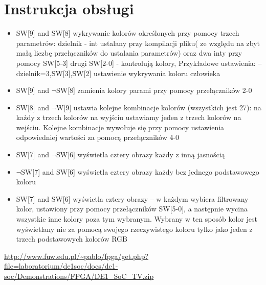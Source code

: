\documentclass{article}
\begin{document}
\section*{Instrukcja obsługi}
\begin{itemize}
    

\item SW[9] and SW[8]
 wykrywanie kolorów określonych przy pomocy trzech parametrów: dzielnik - int ustalany przy kompilacji pliku( ze względu
na zbyt małą liczbę przełączników do ustalania parametrów) oraz dwa inty przy pomocy SW[5-3] drugi SW[2-0] - kontrolują kolory,
Przykładowe ustawienia: 
--dzielnik=3,SW[3],SW[2] ustawienie wykrywania koloru człowieka


\item SW[9] and $\neg$SW[8] zamienia kolory parami przy pomocy przełączników 2-0


\item SW[8] and $\neg$W[9] 
ustawia kolejne kombinacje kolorów (wszystkich jest 27): na każdy z trzech kolorów na wyjściu ustawiamy jeden z trzech kolorów na wejściu. Kolejne kombinacje wywołuje się przy pomocy ustawienia odpowiedniej wartości za pomocą przełączników 4-0


\item SW[7] and $\neg$SW[6]
wyświetla cztery obrazy każdy z inną jasnością


\item $\neg$SW[7] and SW[6]
wyświetla cztery obrazy każdy bez jednego podstawowego koloru


\item SW[7] and SW[6]
wyświetla cztery obrazy -- w każdym wybiera filtrowany  kolor, ustawiony przy pomocy przełączników SW[5-0], a następnie wycina wszystkie inne kolory poza tym wybranym. Wybrany w ten sposób kolor jest wyświetlany nie za pomocą swojego rzeczywistego koloru tylko jako jeden z trzech podstawowych kolorów RGB

\end{itemize}



\begin{thebibliography}{1}

  \url{http://www.fuw.edu.pl/~pablo/fpga/get.php?file=laboratorium/de1soc/docs/de1-soc/Demonstrations/FPGA/DE1_SoC_TV.zip}

 

  \end{thebibliography}

 
\end{document}

